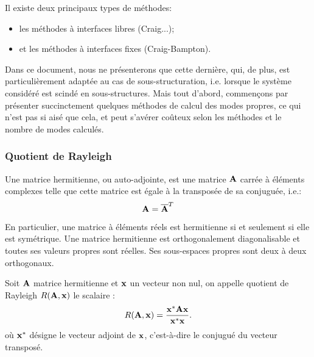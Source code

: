 \medskip
Il existe deux principaux types de méthodes:
\begin{itemize}
   \item les méthodes à interfaces libres (Craig...);
   \item et les méthodes à interfaces fixes (Craig-Bampton).
\end{itemize}
Dans ce document, nous ne présenterons que cette dernière, qui, de plus,
est particulièrement adaptée au cas de sous-structuration, i.e. lorsque le système considéré est scindé en
sous-structures.
\medskipvm
Mais tout d'abord, commençons par présenter succinctement quelques méthodes de calcul des modes propres, ce qui n'est
pas si aisé que cela, et peut  s'avérer coûteux selon les méthodes et le nombre de modes calculés.

\medskip
\subsubsection{Quotient de Rayleigh}

\begin{definition}
Une matrice hermitienne, ou auto-adjointe, est une matrice $\MM{A}$ carrée à éléments complexes  telle que
cette matrice est égale à la transposée de sa conjuguée, i.e.:
\begin{equation}
\MM{A} = \overline{\MM{A}}^T
\end{equation}
\end{definition}
En particulier, une matrice à éléments réels est hermitienne si et seulement si elle est symétrique.
\medskipvm
Une matrice hermitienne est orthogonalement diagonalisable et toutes ses valeurs propres sont
réelles. Ses sous-espaces propres sont deux à deux orthogonaux.

\begin{definition}
Soit $\MM{A}$ matrice hermitienne et $\VV{x}$ un vecteur non nul, on appelle quotient de Rayleigh $R(\MM{A},\VV{x})$ le scalaire :
\begin{equation}
    R(\MM{A},\VV{x}) = \frac{\VV{x}^{*} \MM{A} \VV{x}}{\VV{x}^{*}\VV{x}}.
\end{equation}
où $\VV{x}^{*}$ désigne le vecteur adjoint de $\VV{x}$, c'est-à-dire le conjugué du vecteur transposé.
\end{definition}

